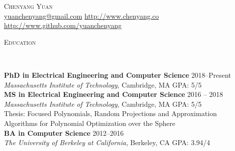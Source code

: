 \documentclass[9pt]{article}
\newenvironment{changemargin}[2]{%
  \begin{list}{}{%
      \setlength{\topsep}{0pt}%
      \setlength{\leftmargin}{#1}%
      \setlength{\rightmargin}{#2}%
      \setlength{\listparindent}{\parindent}%
      \setlength{\itemindent}{\parindent}%
      \setlength{\parsep}{\parskip}%
    }%
  \item[]}{\end{list}
}
\newcommand{\lineover}{
  \begin{changemargin}{-0.05in}{-0.05in}
    \vspace*{-8pt}
    \hrulefill \\
    \vspace*{-2pt}
  \end{changemargin}
}
\newcommand{\header}[1]{
  \begin{changemargin}{-0.5in}{-0.5in}
    \scshape{#1}\\
    \lineover
  \end{changemargin}
}
\newcommand{\contact}[2]{
  \begin{changemargin}{-0.5in}{-0.5in}
    \begin{center}
      {\Large \scshape {#1}}\\ \smallskip
      {#2}\\ \smallskip
    \end{center}
  \end{changemargin}
}
\newenvironment{body} {
  \vspace*{-16pt}
  \begin{changemargin}{-0.25in}{-0.5in}
  }
  {\end{changemargin}
}
\begin{document}
\contact{Chenyang Yuan}{\url{yuanchenyang@gmail.com} \quad
  \url{http://www.chenyang.co} \quad \url{http://www.github.com/yuanchenyang}
}

\header{Education}
\begin{body}
  \vspace{14pt}
  \textbf{PhD in Electrical Engineering and Computer Science } \hfill  2018--Present\\
  \emph{Massachusetts Institute of Technology}, Cambridge, MA{} \hfill GPA: 5/5 \\

  \vspace{5pt}
  \textbf{MS in Electrical Engineering and Computer Science } \hfill  2016 -- 2018 \\
  \emph{Massachusetts Institute of Technology}, Cambridge, MA{} \hfill GPA: 5/5 \\
  Thesis: Focused Polynomials, Random Projections and Approximation Algorithms
  for Polynomial Optimization over the Sphere \\

  \vspace{5pt}
  \textbf{BA in Computer Science} \hfill  2012--2016 \\
  \emph{The University of Berkeley at California}, Berkeley, CA{} \hfill GPA: 3.94/4 \\
\end{body}
\smallskip
\end{document}
